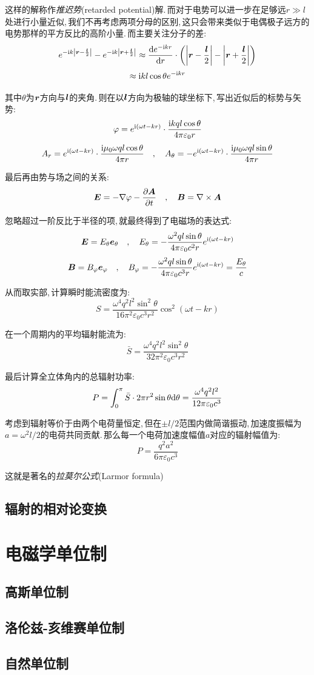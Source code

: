 这样的解称作\emph{推迟势}(retarded potential)解.\,而对于电势可以进一步在足够远$r\gg l$处进行小量近似,\,我们不再考虑两项分母的区别,\,这只会带来类似于电偶极子远方的电势那样的平方反比的高阶小量.\,而主要关注分子的差:
\[e^{- {\rm i} k\left|\boldsymbol{r}-\frac{\boldsymbol{l}}{2}\right|}-e^{- {\rm i} k\left|\boldsymbol{r}+\frac{\boldsymbol{l}}{2}\right|}\approx \frac{\textrm{d} e^{-{\rm i} kr}}{\textrm{d} r}\cdot\left(\left|\boldsymbol{r}-\frac{\boldsymbol{l}}{2}\right|-\left|\boldsymbol{r}+\frac{\boldsymbol{l}}{2}\right|\right)\]
\[\approx {\rm i} kl\cos\theta e^{- {\rm i} kr}\]

其中$\theta$为$\boldsymbol{r}$方向与$\boldsymbol{l}$的夹角.\,则在以$\boldsymbol{l}$方向为极轴的球坐标下,\,写出近似后的标势与矢势:
\[\varphi=e^{{\rm i}(\omega t- kr)}\cdot\frac{{\rm i} kql\cos\theta}{4\pi\varepsilon_0 r} \]
\[A_r=e^{{\rm i}(\omega t- kr)}\cdot\frac{{\rm i} \mu_0\omega ql\cos\theta}{4\pi r}\quad ,\quad  A_\theta=-e^{{\rm i}(\omega t- kr)}\cdot\frac{{\rm i} \mu_0\omega ql\sin\theta}{4\pi r}\]

最后再由势与场之间的关系:
\[\boldsymbol{E}=-\nabla \varphi-\frac{\partial \boldsymbol{A}}{\partial t}\quad ,\quad\boldsymbol{B}=\nabla \times \boldsymbol{A}\]

忽略超过一阶反比于半径的项,\,就最终得到了电磁场的表达式:
\[\boldsymbol{E}=E_\theta \boldsymbol{e}_\theta\quad ,\quad E_\theta=-\frac{\omega^2 q l \sin\theta}{4\pi\varepsilon_0 c^2 r}e^{{\rm i}(\omega t- kr)}\]
\[\boldsymbol{B}=B_\varphi \boldsymbol{e}_\varphi\quad ,\quad B_\varphi=-\frac{\omega^2 q l \sin\theta}{4\pi\varepsilon_0 c^3 r}e^{{\rm i}(\omega t- kr)}=\frac{E_\theta}{c}\]

从而取实部,\,计算瞬时能流密度为:
\[S=\frac{\omega^4q^2l^2\sin^2\theta}{16\pi^2\varepsilon_0 c^3 r^2 }\cos^2(\omega t-kr)\]

在一个周期内的平均辐射能流为:
\[\bar{S}=\frac{\omega^4q^2l^2\sin^2\theta}{32\pi^2\varepsilon_0 c^3 r^2 }\]

最后计算全立体角内的总辐射功率:
\[P=\int_0^\pi \bar{S}\cdot 2\pi r^2\sin\theta\textrm{d} \theta=\frac{\omega^4q^2l^2}{12\pi\varepsilon_0 c^3  }\]

考虑到辐射等价于由两个电荷量恒定,\,但在$\pm l/2$范围内做简谐振动,\,加速度振幅为$a=\omega^2 l/2$的电荷共同贡献.\,那么每一个电荷加速度幅值$a$对应的辐射幅值为:
\[P=\frac{q^2a^2}{6\pi\varepsilon_0 c^3  }\]

这就是著名的\emph{拉莫尔公式}(Larmor formula)


\subsection{辐射的相对论变换}

\section{电磁学单位制}

\subsection{高斯单位制}

\subsection{洛伦兹-亥维赛单位制}

\subsection{自然单位制}